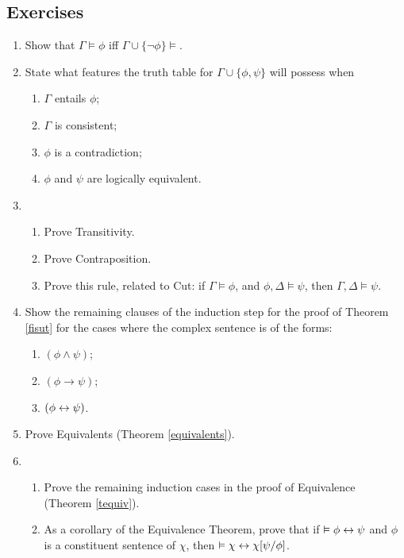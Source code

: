 {\small


\subsection*{Exercises} \label{ex4}


\begin{enumerate}
	\item Show that $\Gamma \vDash \phi$ iff $\Gamma \cup \{\neg \phi\} \vDash$.

	\item State what features the truth table for $\Gamma \cup \{\phi,\psi\}$ will possess when \begin{enumerate}
		\item $\Gamma$ entails $\phi$;
		\item $\Gamma$ is consistent;
		\item $\phi$ is a contradiction;
		\item $\phi$ and $\psi$ are logically equivalent.
	\end{enumerate}
	
\item \begin{enumerate}
	\item Prove Transitivity.
	\item Prove Contraposition.
	\item Prove this rule, related to Cut: if $\Gamma \vDash \phi$, and $\phi,\Delta \vDash \psi$, then $\Gamma,\Delta \vDash \psi$.
\end{enumerate} 

\item Show the remaining clauses of the induction step for the proof of Theorem \ref{fisut} for the cases where the complex sentence is of the forms: \begin{enumerate}
	\item $(\phi \wedge \psi)$;
	\item $(\phi \to \psi)$;
	\item $(\phi \leftrightarrow \psi)$.
\end{enumerate}


\item Prove Equivalents (Theorem \ref{equivalents}).

\item \begin{enumerate}
	\item Prove the remaining induction cases in the proof of Equivalence (Theorem \ref{tequiv}).
	\item As a corollary of the Equivalence Theorem, prove that if $\vDash \phi\leftrightarrow\psi$ and $\phi$ is a constituent sentence of $\chi$, then $\vDash \chi \leftrightarrow \chi[\psi/\phi]$.
\end{enumerate}


\end{enumerate}}
